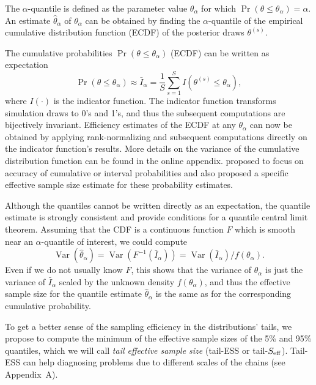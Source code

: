 \documentclass[american,]{article}
\DeclareMathOperator{\Var}{Var}
\theoremstyle{definition}
\begin{document}
The \(\alpha\)-quantile
is defined as the parameter value \(\theta_\alpha\) for which
\(\Pr(\theta \leq \theta_\alpha) = \alpha\). An estimate
\(\hat{\theta}_\alpha\) of \(\theta_\alpha\) can be obtained by
finding the \(\alpha\)-quantile of the empirical cumulative distribution function (ECDF) of the
posterior draws \(\theta^{(s)}\).

The cumulative probabilities \(\Pr(\theta \leq \theta_\alpha)\) (ECDF) can be written as expectation
\begin{equation}
\Pr(\theta \leq \theta_\alpha) \approx \bar{I}_\alpha = \frac{1}{S}\sum_{s=1}^S
I(\theta^{(s)} \leq\theta_\alpha),
\end{equation}
where \(I(\cdot)\) is the indicator function. The indicator function
transforms simulation draws to 0's and 1's, and thus the subsequent
computations are bijectively invariant.
%
Efficiency estimates of the ECDF at any \(\theta_\alpha\) can now be
obtained by applying rank-normalizing and subsequent computations
directly on the indicator function's results.
%
More details on the variance of the cumulative
distribution function can be found in the online appendix.
%
\citet{Raftery+Lewis:1992a} proposed to focus on accuracy of
cumulative or interval probabilities and also proposed a specific effective
sample size estimate for these probability estimates.

Although the quantiles cannot be written directly as an expectation,
the quantile estimate is strongly consistent and
\citet{Doss+etal:2014:MCMC-quantiles} provide conditions for a
quantile central limit theorem.
%
Assuming that the CDF is a continuous function \(F\) which is smooth
near an \(\alpha\)-quantile of interest, we could compute 
\begin{equation}
  \Var(\hat{\theta}_\alpha) = \Var(F^{-1}(\bar{I}_\alpha)) = \Var(\bar{I}_\alpha)/f(\theta_\alpha).
\end{equation}
%
Even if we do not usually know \(F\), this shows that the variance of
\(\theta_\alpha\) is just the variance of \(\bar{I}_\alpha\) scaled by
the unknown density \(f(\theta_\alpha)\), and thus the
effective sample size for the quantile estimate
\(\hat{\theta}_\alpha\) is the same as for the corresponding
cumulative probability.

To get a better sense of the sampling efficiency in the
distributions' tails, we propose to compute the minimum of the effective
sample sizes of the 5\% and 95\% quantiles, which we will call
\emph{tail effective sample size} (tail-ESS or tail-\(S_{\rm eff}\)).
Tail-ESS can help diagnosing problems due to different scales of the
chains (see Appendix~A).
\end{document}
